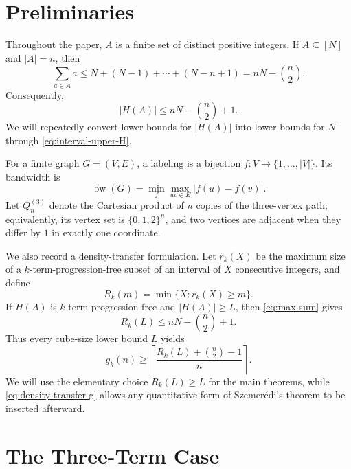 \documentclass[11pt]{article}
\numberwithin{equation}{section}
\theoremstyle{definition}
\theoremstyle{remark}
\newcommand{\bw}{\operatorname{bw}}
\begin{document}
\section{Preliminaries}\label{sec:preliminaries}

Throughout the paper, $A$ is a finite set of distinct positive integers. If $A\subseteq[N]$ and $|A|=n$, then
\begin{equation}\label{eq:max-sum}
\sum_{a\in A}a\le N+(N-1)+\cdots+(N-n+1)=nN-\binom{n}{2}.
\end{equation}
Consequently,
\begin{equation}\label{eq:interval-upper-H}
|H(A)|\le nN-\binom{n}{2}+1.
\end{equation}
We will repeatedly convert lower bounds for $|H(A)|$ into lower bounds for $N$ through \eqref{eq:interval-upper-H}.

\bigskip
\noindent
For a finite graph $G=(V,E)$, a labeling is a bijection $f:V\to\{1,\ldots,|V|\}$. Its bandwidth is
\begin{equation}\label{eq:bandwidth-definition}
\bw(G)=\min_f\max_{uv\in E}|f(u)-f(v)|.
\end{equation}
Let $Q_n^{(3)}$ denote the Cartesian product of $n$ copies of the three-vertex path; equivalently, its vertex set is $\{0,1,2\}^n$, and two vertices are adjacent when they differ by $1$ in exactly one coordinate.

\bigskip
\noindent
We also record a density-transfer formulation. Let $r_k(X)$ be the maximum size of a $k$-term-progression-free subset of an interval of $X$ consecutive integers, and define
\begin{equation}\label{eq:Rk-definition}
R_k(m)=\min\{X:r_k(X)\ge m\}.
\end{equation}
If $H(A)$ is $k$-term-progression-free and $|H(A)|\ge L$, then \eqref{eq:max-sum} gives
\begin{equation}\label{eq:density-transfer-basic}
R_k(L)\le nN-\binom{n}{2}+1.
\end{equation}
Thus every cube-size lower bound $L$ yields
\begin{equation}\label{eq:density-transfer-g}
g_k(n)\ge \left\lceil\frac{R_k(L)+\binom{n}{2}-1}{n}\right\rceil.
\end{equation}
We will use the elementary choice $R_k(L)\ge L$ for the main theorems, while \eqref{eq:density-transfer-g} allows any quantitative form of Szemer\'edi's theorem to be inserted afterward.

\section{The Three-Term Case}\label{sec:k3}
\end{document}
